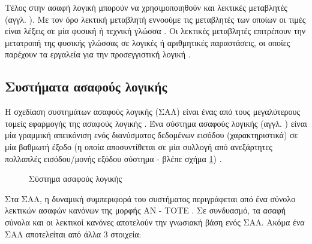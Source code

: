 \documentclass{assignment}
\begin{document}
Τέλος στην ασαφή λογική μπορούν να χρησιμοποιηθούν και λεκτικές μεταβλητές (αγγλ. ). Με τον όρο λεκτική μεταβλητή εννοούμε τις μεταβλητές των οποίων οι τιμές είναι λέξεις σε μία φυσική ή τεχνική γλώσσα \cite{zadeh1975concept}. Οι λεκτικές μεταβλητές επιτρέπουν την μετατροπή της φυσικής γλώσσας σε λογικές ή αριθμητικές παραστάσεις, οι οποίες παρέχουν τα εργαλεία για την προσεγγιστική λογική \cite{engelbrecht}.

\subsection{Συστήματα ασαφούς λογικής}

Η σχεδίαση συστημάτων ασαφούς λογικής (ΣΑΛ) είναι ένας από τους μεγαλύτερους τομείς εφαρμογής της ασαφούς λογικής \cite{engelbrecht}. Ένα σύστημα ασαφούς λογικής (αγγλ. ) είναι μία γραμμική απεικόνιση ενός διανύσματος δεδομένων εισόδου (χαρακτηριστικά) σε μία βαθμωτή έξοδο (η οποία αποσυντίθεται σε μία συλλογή από ανεξάρτητες πολλαπλές εισόδου/μονής εξόδου σύστημα - βλέπε σχήμα \ref{fig:fuzzy_logic_system}) \cite{mendel364485,class_notes}.

\begin{figure}
\begin{center}
\caption{Σύστημα ασαφούς λογικής \cite{mendel364485,class_notes}}
\label{fig:fuzzy_logic_system}
\end{center}
\end{figure}

Στα ΣΑΛ, η δυναμική συμπεριφορά του συστήματος περιγράφεται από ένα σύνολο λεκτικών ασαφών κανόνων της μορφής ΑΝ - ΤΟΤΕ \cite{engelbrecht, class_notes}. Σε συνδυασμό, τα ασαφή σύνολα και οι λεκτικοί κανόνες αποτελούν την γνωσιακή βάση ενός ΣΑΛ. Ακόμα ένα ΣΑΛ αποτελείται από άλλα 3 
στοιχεία:
\end{document}
